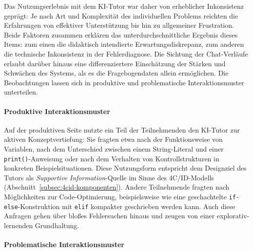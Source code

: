 Das Nutzungserlebnis mit dem KI-Tutor war daher von erheblicher Inkonsistenz geprägt: Je nach Art und Komplexität des individuellen Problems reichten die Erfahrungen von effektiver Unterstützung bis hin zu allgemeiner Frustration. Beide Faktoren zusammen erklären das unterdurchschnittliche Ergebnis dieses Items: zum einen die didaktisch intendierte Erwartungsdiskrepanz, zum anderen die technische Inkonsistenz in der Fehlerdiagnose. Die Sichtung der Chat-Verläufe erlaubt darüber hinaus eine differenziertere Einschätzung der Stärken und Schwächen des Systems, als es die Fragebogendaten allein ermöglichen. Die Beobachtungen lassen sich in produktive und problematische Interaktionsmuster unterteilen.

\paragraph{Produktive Interaktionsmuster}

Auf der produktiven Seite nutzte ein Teil der Teilnehmenden den KI-Tutor zur aktiven Konzeptvertiefung: Sie fragten etwa nach der Funktionsweise von Variablen, nach dem Unterschied zwischen einem String-Literal und einer \texttt{print()}-Anweisung oder nach dem Verhalten von Kontrollstrukturen in konkreten Beispielsituationen. Diese Nutzungsform entspricht dem Designziel des Tutors als \textit{Supportive Information}-Quelle im Sinne des 4C/ID-Modells (Abschnitt~\ref{subsec:4cid-komponenten}). Andere Teilnehmende fragten nach Möglichkeiten zur Code-Optimierung, beispielsweise wie eine geschachtelte \texttt{if-else}-Konstruktion mit \texttt{elif} kompakter geschrieben werden kann. Auch diese Anfragen gehen über bloßes Fehlersuchen hinaus und zeugen von einer explorativ-lernenden Grundhaltung.

\paragraph{Problematische Interaktionsmuster}

